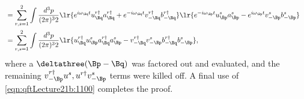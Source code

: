 {\begin{equation}
\begin{aligned}
{} \\
&=
\sum_{r,s = 1}^2
\int \frac{d^3 p }{(2 \pi)^3 2 }
\lr{
   e^{i \omega_\Bq t }
   u^{r \dagger}_\Bq a_\Bq^{r \dagger}
+
   e^{-i \omega_\Bq t }
   v^{r \dagger}_{-\Bq} b_{-\Bq}^{r \dagger}
}
\lr{
   e^{-i \omega_\Bp t }
   u^s_\Bp a_\Bp^s
-
   e^{i \omega_\Bp t }
   v^s_{-\Bp} b_{-\Bp}^s
} \\
&=
\sum_{r,s = 1}^2
\int \frac{d^3 p }{(2 \pi)^3 2 }
\lr{
   u^{r \dagger}_\Bq
   u^s_\Bp
   a_\Bq^{r \dagger}
   a_\Bp^s
-
   v^{r \dagger}_{-\Bq}
   v^s_{-\Bp}
   b_{-\Bq}^{r \dagger}
   b_{-\Bp}^s
},
\end{aligned}
\end{equation}
where a \( \deltathree(\Bp-\Bq) \) was factored out and evaluated, and the remaining \( v^{r\dagger}_{-\Bp} u^s, u^{r \dagger} v^s_{-\Bp} \) terms were killed off.
A final use of \cref{eqn:qftLecture21b:1100} completes the proof.
} %
